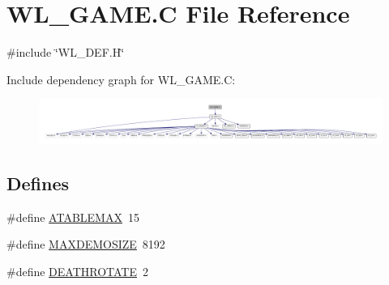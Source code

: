 \hypertarget{WL__GAME_8C}{
\section{WL\_\-GAME.C File Reference}
\label{WL__GAME_8C}
}
{\ttfamily \#include \char`\"{}WL\_\-DEF.H\char`\"{}}\par
Include dependency graph for WL\_\-GAME.C:
\nopagebreak
\begin{figure}[H]
\begin{center}
\leavevmode
\includegraphics[width=400pt]{WL__GAME_8C__incl}
\end{center}
\end{figure}
\subsection*{Defines}
\begin{DoxyCompactItemize}
\item 
\#define \hyperlink{WL__GAME_8C_adcafcef97d599aa302417e07314b383e}{ATABLEMAX}~15
\item 
\#define \hyperlink{WL__GAME_8C_aaf11b6b2956339d126a6e7bd64ff424f}{MAXDEMOSIZE}~8192
\item 
\#define \hyperlink{WL__GAME_8C_ab00a0bb7de069439ebf6f9e01211523a}{DEATHROTATE}~2
\end{DoxyCompactItemize}
